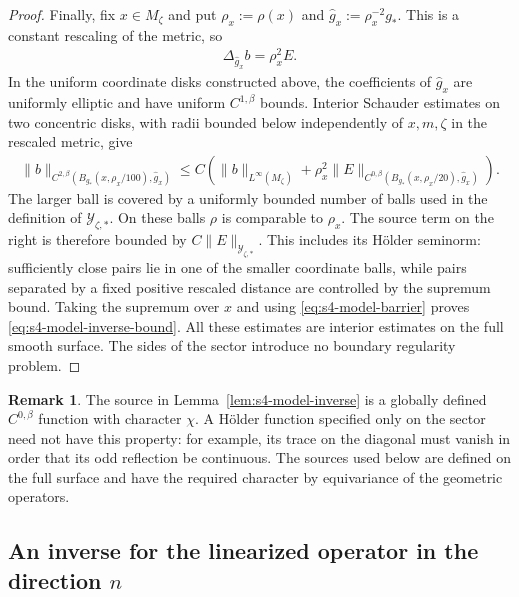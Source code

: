 \documentclass[a4paper,11pt,oneside,reqno]{amsart}
\numberwithin{equation}{section}
\theoremstyle{definition}
\newtheorem{remark}[theorem]{Remark}
\begin{document}
\begin{proof}
    Finally, fix $x\in M_\zeta$ and put
    $\rho_x:=\rho(x)$ and $\widehat g_x:=\rho_x^{-2}g_*$.
    This is a constant rescaling of the metric, so
    \begin{align*}
        \Delta_{\widehat g_x}b=\rho_x^2 E.
    \end{align*}
    In the uniform coordinate disks constructed above,
    the coefficients of $\widehat g_x$ are uniformly
    elliptic and have uniform $C^{1,\beta}$ bounds.
    Interior Schauder estimates on two concentric
    disks, with radii bounded below independently
    of $x,m,\zeta$ in the rescaled metric, give
    \begin{align*}
        \|b\|_{C^{2,\beta}
          (B_{g_*}(x,\rho_x/100),\widehat g_x)}\leq C\left(
            \|b\|_{L^\infty(M_\zeta)}
            +\rho_x^2\|E\|_{C^{0,\beta}
              (B_{g_*}(x,\rho_x/20),\widehat g_x)}
                       \right).
    \end{align*}
    The larger ball is covered by a uniformly bounded
    number of balls used in the definition of
    $\mathcal Y_{\zeta,*}$. On these balls $\rho$
    is comparable to $\rho_x$. The source term on
    the right is therefore bounded by
    $C\|E\|_{\mathcal Y_{\zeta,*}}$. This includes
    its H\"older seminorm: sufficiently close pairs
    lie in one of the smaller coordinate balls, while
    pairs separated by a fixed positive rescaled
    distance are controlled by the supremum bound.
    Taking the supremum over $x$ and using
    \eqref{eq:s4-model-barrier} proves
    \eqref{eq:s4-model-inverse-bound}.
    All these estimates are interior estimates on
    the full smooth surface. The sides of the sector
    introduce no boundary regularity problem.
\end{proof}

\begin{remark}
    \label{rem:s4-forcing-symmetry}
    The source in Lemma~\ref{lem:s4-model-inverse} is
    a globally defined $C^{0,\beta}$ function with
    character $\chi$. A H\"older function specified
    only on the sector need not have this property:
    for example, its trace on the diagonal must vanish
    in order that its odd reflection be continuous.
    The sources used below are defined on the full
    surface and have the required character by
    equivariance of the geometric operators.
\end{remark}

\subsection{An inverse for the linearized operator in the direction $n$}
\end{document}
